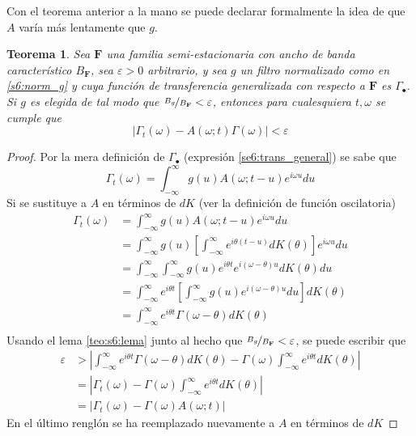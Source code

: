 \documentclass[12pt,letterpaper]{book}
\newtheorem{teorema}{Teorema}[chapter]
\newcommand{\intR}{\int_{-\infty}^{\infty}}
\newcommand{\ef}{\mathbf{F}}
\newcommand{\abso}[1]{\left| #1 \right|}
\begin{document}
Con el teorema anterior a la mano se puede declarar formalmente la idea de que $A$ varía más lentamente que $g$.

\begin{teorema}
\label{teo:aprox_gamma} 
Sea $\ef$ una familia semi-estacionaria con ancho de banda característico $B_\ef$, sea $\varepsilon >0$ arbitrario, y sea $g$ un filtro normalizado como en \ref{s6:norm_g} y cuya función de transferencia generalizada con respecto a $\ef$ es $\Gamma_\bullet$. 
%
Si $g$ es elegida de tal modo que $\nicefrac{B_g}{B_\ef} < \varepsilon$, entonces para cualesquiera $t, \omega$ se cumple que
\begin{equation}
\abso{\Gamma_t(\omega)- A(\omega; t)\Gamma(\omega)} < \varepsilon
\end{equation}
\end{teorema}

\begin{proof}
Por la mera definición de $\Gamma_\bullet$ (expresión \ref{se6:trans_general}) se sabe que
\begin{equation*}
\Gamma_t (\omega) = \intR g(u) A(\omega; t-u) e^{i \omega u} du
\end{equation*}
Si se sustituye a $A$ en términos de $dK$ (ver la definición de función oscilatoria)
\begingroup
\allowdisplaybreaks
\begin{align*}
\Gamma_t (\omega) &= \intR g(u) A(\omega; t-u) e^{i \omega u} du \\
&= 
\intR g(u) \left[ \intR e^{i \theta (t-u)} dK(\theta) \right] e^{i \omega u} du \\
&=
\intR \intR g(u) e^{i \theta t} e^{i (\omega- \theta) u} dK(\theta) du \\
&=
\intR e^{i \theta t} \left[ \intR g(u) e^{i (\omega- \theta) u} du \right] dK(\theta) \\
&=
\intR e^{i \theta t} \Gamma(\omega - \theta) dK(\theta) \\
\end{align*}
\endgroup
Usando el lema \ref{teo:s6:lema} junto al hecho que $\nicefrac{B_g}{B_\ef} < \varepsilon$, se puede escribir que
\begin{align*}
\varepsilon 
&> 
\abso{\intR e^{i \theta t} \Gamma(\omega - \theta) dK(\theta) - 
\Gamma(\omega) \intR e^{i \theta t} dK(\theta) } \\
&=
\abso{\Gamma_t (\omega) - 
\Gamma(\omega) \intR e^{i \theta t} dK(\theta) } \\
&=
\abso{\Gamma_t (\omega) - 
\Gamma(\omega) A(\omega; t) }
\end{align*}
En el último renglón se ha reemplazado nuevamente a $A$ en términos de $dK	$
\end{proof}
\end{document}
